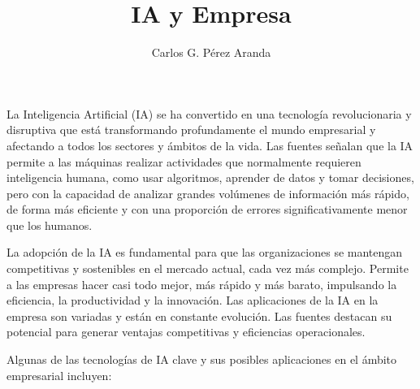 \documentclass[12pt, a4paper, twoside]{article}
\title{IA y Empresa}
\author{Carlos G. Pérez Aranda}
\begin{document}
\maketitle
\newpage
La Inteligencia Artificial (IA) se ha convertido en una tecnología revolucionaria y disruptiva que está transformando profundamente el mundo empresarial y afectando 
a todos los sectores y ámbitos de la vida. Las fuentes señalan que la IA permite a las máquinas realizar actividades que normalmente requieren inteligencia humana, 
como usar algoritmos, aprender de datos y tomar decisiones, pero con la capacidad de analizar grandes volúmenes de información más rápido, de forma más eficiente y 
con una proporción de errores significativamente menor que los humanos.

La adopción de la IA es fundamental para que las organizaciones se mantengan competitivas y sostenibles en el mercado actual, cada vez más complejo. Permite a 
las empresas hacer casi todo mejor, más rápido y más barato, impulsando la eficiencia, la productividad y la innovación.
Las aplicaciones de la IA en la empresa son variadas y están en constante evolución. Las fuentes destacan su potencial para generar ventajas competitivas y 
eficiencias operacionales.

Algunas de las tecnologías de IA clave y sus posibles aplicaciones en el ámbito empresarial incluyen:
\end{document}
